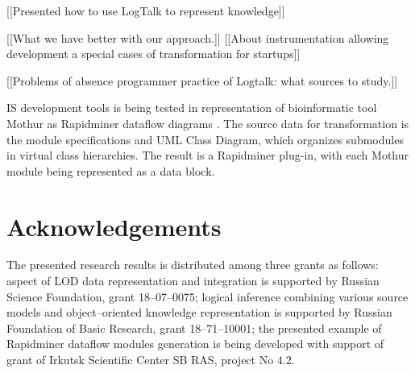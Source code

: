 \documentclass[conference]{IEEEtran}
\begin{document}
[[Presented how to use LogTalk to represent knowledge]]

[[What we have better with our approach.]] [[About instrumentation allowing development a special cases of transformation for startups]]

[[Problems of absence programmer practice of Logtalk: what sources to study.]]

IS development tools is being tested in representation of bioinformatic tool Mothur as Rapidminer dataflow diagrams \cite{dataflow}.  The source data for transformation is the module specifications and UML Class Diagram, which organizes submodules in virtual class hierarchies.  The result is a Rapidminer plug-in, with each Mothur module being represented as a data block.

\section{Acknowledgements}
\label{sec:ack-descr}

The presented research results is distributed among three grants as follows: aspect of LOD data representation and integration is supported by Russian Science Foundation, grant 18--07--0075; logical inference combining various source models and object--oriented knowledge representation is supported by Russian Foundation of Basic Research, grant 18--71--10001; the presented example of Rapidminer dataflow modules generation is being developed with support of grant of Irkutsk Scientific Center SB RAS, project No 4.2.
\end{document}

